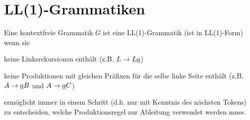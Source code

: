 {\begin{comment}
\path [->] (0) edge (1);
\path [->] (0) edge (2);
\path [->] (0) edge (3);

\path [->] (3) edge (4);
\path [->] (3) edge (5);
\path [->] (3) edge (6);

\path [->] (2) edge (7);
\path [->] (5) edge (8);
\path [->] (6) edge (9);
\end{tikzpicture}
&
\begin{tikzpicture}[node distance=1.8cm, auto]
\node [state] (0) {E};

\node [state, below of=0, accepting] (1) {\u{*}};
\node [state, left of=1] (3) {E};
\node [state, right of=1] (2) {E};

\node [state, below of=3, accepting] (4) {\u{+}};
\node [state, left of=4] (5) {E};
\node [state, right of=4] (6) {E};

\node [state, below of=2, accepting] (7) {\u{num}};

\node [state, below of=5, accepting] (8) {\u{num}};
\node [state, below of=6, accepting] (9) {\u{num}};

\path [->] (0) edge (1);
\path [->] (0) edge (2);
\path [->] (0) edge (3);

\path [->] (3) edge (4);
\path [->] (3) edge (5);
\path [->] (3) edge (6);

\path [->] (2) edge (7);
\path [->] (5) edge (8);
\path [->] (6) edge (9);
\end{tikzpicture}
\end{tabular}

Das geparste Wort kann in den Blättern des Baumes von links nach rechts abgelesen werden. Hier ist die Mehrdeutigkeit ebenfalls sehr gut erkennbar.

Eine weitere Beobachtung ist, dass es ungünstig ist wenn es für unseren Parser nicht genügt, dass aktuelle Token zu kennen sondern für das Parsing auch weitere nachfolgende Tokens ermittelt werden müssen.
Ist das Eingabewort \verb|num|, so haben wir 3 Regeln die alle zutreffen könnten (ohne Kenntnis der nachfolgenden Tokens).
\ifthenelse{\boolean{long}}{}{\end{comment}}
\section{LL(1)-Grammatiken}
\begin{defn}[LL(1)-Grammatik]
Eine kontextfreie Grammatik $G$ ist eine LL(1)-Grammatik (ist in LL(1)-Form) wenn sie
\begin{\whichitem}
\item keine Linksrekursionen enthält (z.B. $L \to L \underline{a}$)
\item keine Produktionen mit gleichen Präfixen für die selbe linke Seite enthält (z.B. $A \to \underline{a} B$ und $A \to \underline{a} C$)
\item ermöglicht immer in einem Schritt (d.h. nur mit Kenntnis des nächsten Tokens) zu entscheiden,
welche Produktionsregel zur Ableitung verwendet werden muss.
\end{\whichitem}
\end{defn}

